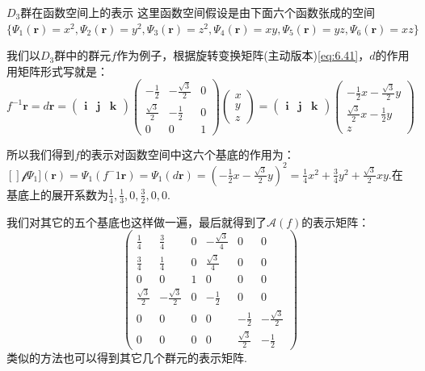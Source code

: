 \begin{example}{$D_3$群在函数空间上的表示}
	这里函数空间假设是由下面六个函数张成的空间$\{\Psi_1(\mathbf{r})=x^2,\Psi_2(\mathbf{r})=y^2,\Psi_3(\mathbf{r})=z^2,\Psi_4(\mathbf{r})=xy,\Psi_5(\mathbf{r})=yz,\Psi_6(\mathbf{r})=xz\}$
	
	我们以$D_3$群中的群元$f$作为例子，根据旋转变换矩阵(主动版本)\ref{eq:6.41}，$d$的作用用矩阵形式写就是：
	\begin{equation*}
			f^{-1}\mathbf{r}=d\mathbf{r}=\begin{pmatrix}
			\mathbf{i} &\mathbf{j}  &\mathbf{k} 
		\end{pmatrix}
		\begin{pmatrix}
			-\frac{1}{2}& -\frac{\sqrt{3}}{2} & 0\\
			\frac{\sqrt{3}}{2} &   -\frac{1}{2} & 0\\
			0 &  0&1
		\end{pmatrix}
		\begin{pmatrix}
			x\\
			y\\
			z
		\end{pmatrix}=
		\begin{pmatrix}
			\mathbf{i} &\mathbf{j}  &\mathbf{k} 
		\end{pmatrix}
		\begin{pmatrix}
			-\frac{1}{2}x-\frac{\sqrt{3}}{2}y  \\
			\frac{\sqrt{3}}{2}x-\frac{1}{2}y  \\
			z
		\end{pmatrix}
	\end{equation*}

\setlength\parindent{2em}所以我们得到$f$的表示对函数空间中这六个基底的作用为：$[]\mathscr{f}\Psi_1](\mathbf{r})=\Psi_1(f^-1\mathbf{r})=\Psi_1(d\mathbf{r})=\left(-\frac{1}{2}x-\frac{\sqrt{3}}{2}y\right)^2=\frac{1}{4}x^2+\frac{3}{4}y^2+\frac{\sqrt{3}}{2}xy$.在基底上的展开系数为$\frac{1}{4},\frac{1}{3},0,\frac{3}{2},0,0$.

我们对其它的五个基底也这样做一遍，最后就得到了$\mathscr{A}(f)$的表示矩阵：
\[\left( {\begin{array}{*{20}{c}}
		{\frac{1}{4}}&{\frac{3}{4}}&0&{ - \frac{{\sqrt 3 }}{4}}&0&0 \\ 
		{\frac{3}{4}}&{\frac{1}{4}}&0&{\frac{{\sqrt 3 }}{4}}&0&0 \\ 
		0&0&1&0&0&0 \\ 
		{\frac{{\sqrt 3 }}{2}}&{ - \frac{{\sqrt 3 }}{2}}&0&{ - \frac{1}{2}}&0&0 \\ 
		0&0&0&0&{ - \frac{1}{2}}&{ - \frac{{\sqrt 3 }}{2}} \\ 
		0&0&0&0&{\frac{{\sqrt 3 }}{2}}&{ - \frac{1}{2}} 
\end{array}} \right)\]
类似的方法也可以得到其它几个群元的表示矩阵.
\end{example}

